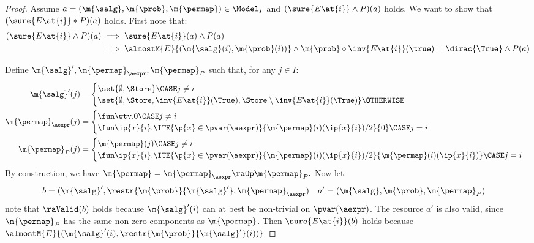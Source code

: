 \begin{proof}
  Assume $a = (\m{\salg}, \m{\prob}, \m{\permap}) \in \Model_I$ and
  $(\sure{E\at{i}} \land P)(a)$ holds.
  We want to show that
  $(\sure{E\at{i}} \ast P)(a)$ holds.
  First note that:
  \begin{align*}
    (\sure{E\at{i}} \land P)(a)
    & \implies \sure{E\at{i}}(a) \land P(a) \\
    & \implies \almostM{E}{(\m{\salg}(i), \m{\prob}(i))}
    \land \m{\prob} \circ \inv{E\at{i}}(\true) = \dirac{\True}
    \land P(a)
  \end{align*}

  Define $\m{\salg}', \m{\permap}_{\aexpr}, \m{\permap}_{P}$ such that,
  for any $j \in I$:
  \begin{align*}
    \m{\salg}'(j) &=
    \begin{cases}
      \set{\emptyset, \Store} \CASE j \neq i\\
      \set{\emptyset, \Store, \inv{E\at{i}}(\True), \Store \setminus
      \inv{E\at{i}}(\True)} \OTHERWISE
    \end{cases}
    \\
    \m{\permap}_{\aexpr}(j) &=
    \begin{cases}
      \fun \wtv.0 \CASE j \ne i \\
      \fun \ip{x}{i}.
        \ITE{\p{x} \in \pvar(\aexpr)}{\m{\permap}(i)(\ip{x}{i})/2}{0}
    \CASE j = i
    \end{cases}
    \\
    \m{\permap}_{P}(j) &=
    \begin{cases}
      \m{\permap}(j) \CASE j \ne i \\
      \fun \ip{x}{i}.
        \ITE{\p{x} \in \pvar(\aexpr)}{\m{\permap}(i)(\ip{x}{i})/2}{\m{\permap}(i)(\ip{x}{i})}
    \CASE j = i
    \end{cases}
  \end{align*}
  By construction, we have
  $
    \m{\permap} = \m{\permap}_{\aexpr} \raOp \m{\permap}_{P}.
  $
  Now let:
  \begin{align*}
    b &= (\m{\salg}', \restr{\m{\prob}}{\m{\salg}'}, \m{\permap}_{\aexpr})
    &
    a' &= (\m{\salg}, \m{\prob}, \m{\permap}_{P})
  \end{align*}
  note that $\raValid(b)$ holds because $\m{\salg}'(i)$ can at best be non-trivial on $\pvar(\aexpr)$.
  The resource $a'$ is also valid, since $\m{\permap}_{P}$ has the same non-zero components as $\m{\permap}$.
  Then
  $\sure{E\at{i}}(b)$ holds because
  $\almostM{E}{( \m{\salg}'(i), \restr{\m{\prob}}{\m{\salg}'}(i) )}$

\end{proof}
